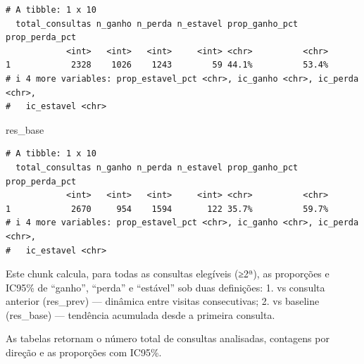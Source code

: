 \documentclass[
]{article}
\newenvironment{Shaded}{\begin{snugshade}}{\end{snugshade}}
\newcommand{\NormalTok}[1]{\textcolor[rgb]{0.00,0.23,0.31}{#1}}
\begin{document}
\begin{verbatim}
# A tibble: 1 x 10
  total_consultas n_ganho n_perda n_estavel prop_ganho_pct prop_perda_pct
            <int>   <int>   <int>     <int> <chr>          <chr>         
1            2328    1026    1243        59 44.1%          53.4%         
# i 4 more variables: prop_estavel_pct <chr>, ic_ganho <chr>, ic_perda <chr>,
#   ic_estavel <chr>
\end{verbatim}

\begin{Shaded}
\begin{Highlighting}[]
\NormalTok{res\_base}
\end{Highlighting}
\end{Shaded}

\begin{verbatim}
# A tibble: 1 x 10
  total_consultas n_ganho n_perda n_estavel prop_ganho_pct prop_perda_pct
            <int>   <int>   <int>     <int> <chr>          <chr>         
1            2670     954    1594       122 35.7%          59.7%         
# i 4 more variables: prop_estavel_pct <chr>, ic_ganho <chr>, ic_perda <chr>,
#   ic_estavel <chr>
\end{verbatim}

Este chunk calcula, para todas as consultas elegíveis (≥2ª), as
proporções e IC95\% de ``ganho'', ``perda'' e ``estável'' sob duas
definições: 1. vs consulta anterior (res\_prev) --- dinâmica entre
visitas consecutivas; 2. vs baseline (res\_base) --- tendência acumulada
desde a primeira consulta.

As tabelas retornam o número total de consultas analisadas, contagens
por direção e as proporções com IC95\%.
\end{document}
